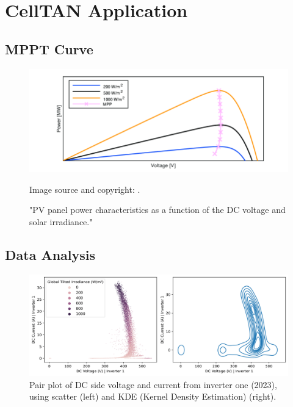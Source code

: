 \chapter{CellTAN Application}

\section{MPPT Curve}

\begin{figure}[h]
    \centering
    \includegraphics[width=14cm]{figures/appendix/b_analysis/mpptcurve.png} \caption{"PV panel power characteristics as a function of the DC voltage and solar irradiance."} Image source and copyright: \cite{lunardi}.
    \label{fig:mpptcurve}
\end{figure}

\FloatBarrier
\section{Data Analysis} \label{ap2:eda}

\begin{figure}[h]
    \centering
    \includegraphics[width=\textwidth]{figures/appendix/b_analysis/05_voltage_current_pairplot_test_1-1.png}
    \caption{Pair plot of DC side voltage and current from inverter one (2023), using scatter (left) and KDE (Kernel Density Estimation) (right).}
    \label{fig:eda_voltage_current_test_1}
\end{figure}


